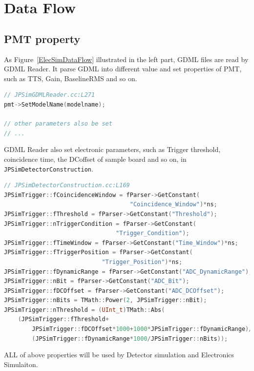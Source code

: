 \section{Data Flow}
\subsection{PMT property}
As Figure~\ref{ElecSimDataFlow} illustrated in the left part, GDML files are read by GDML Reader. It parse GDML into different value and set properties of PMT, 
such as TTS, Gain, BaselineRMS and so on.
\begin{lstlisting}[language=c++]
// JPSimGDMLReader.cc:L271
pmt->SetModelName(modelname);

// other parameters also be set
// ...
\end{lstlisting}
GDML Reader also set electronic parameters, such as Trigger threshold, coincidence time, the DCoffset of sample board and so on, in \texttt{JPSimDetectorConstruction}.
\begin{lstlisting}[language=c++]
// JPSimDetectorConstruction.cc:L169
JPSimTrigger::fCoincidenceWindow = fParser->GetConstant(
                                    "Coincidence_Window")*ns;
JPSimTrigger::fThreshold = fParser->GetConstant("Threshold");
JPSimTrigger::nTriggerCondition = fParser->GetConstant(
                                "Trigger_Condition");
JPSimTrigger::fTimeWindow = fParser->GetConstant("Time_Window")*ns;
JPSimTrigger::fTriggerPosition = fParser->GetConstant(
                            "Trigger_Position")*ns;
JPSimTrigger::fDynamicRange = fParser->GetConstant("ADC_DynamicRange");
JPSimTrigger::nBit = fParser->GetConstant("ADC_Bit");
JPSimTrigger::fDCOffset = fParser->GetConstant("ADC_DCOffset");
JPSimTrigger::nBits = TMath::Power(2, JPSimTrigger::nBit);
JPSimTrigger::nThreshold = (UInt_t)TMath::Abs(
    (JPSimTrigger::fThreshold+
        JPSimTrigger::fDCOffset*1000+1000*JPSimTrigger::fDynamicRange)/
        (JPSimTrigger::fDynamicRange*1000/JPSimTrigger::nBits));
\end{lstlisting}
ALL of above properties will be used by Detector simulation and Electronics Simulaiton.
